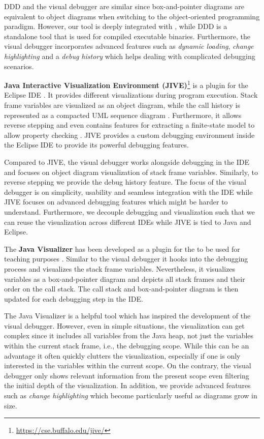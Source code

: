 \documentclass[sigconf]{acmart}
\begin{document}
DDD and the visual debugger are similar since box-and-pointer diagrams are equivalent to object diagrams when switching to the object-oriented programming paradigm.
However, our tool is deeply integrated with \intellij{}, while DDD is a standalone tool that is used for compiled executable binaries.
Furthermore, the visual debugger incorporates advanced features such as \textit{dynamic loading}, \textit{change highlighting} and a \textit{debug history} which helps dealing with complicated debugging scenarios.

\textbf{Java Interactive Visualization Environment (JIVE)}\footnote{\url{https://cse.buffalo.edu/jive/}} is a plugin for the Eclipse IDE \cite{gestwickiJIVEJavaInteractive2004}.
It provides different visualizations during program execution.
Stack frame variables are visualized as an object diagram, while the call history is represented as a compacted UML sequence diagram \cite{jayaramanCompactVisualizationJava2017}.
Furthermore, it allows reverse stepping and even contains features for extracting a finite-state model to allow property checking \cite{k.p.FiniteStateModel2021}.
JIVE provides a custom debugging environment inside the Eclipse IDE to provide its powerful debugging features.

Compared to JIVE, the visual debugger works alongside debugging in the IDE and focuses on object diagram visualization of stack frame variables.
Similarly, to reverse stepping we provide the debug history feature.
The focus of the visual debugger is on simplicity, usability and seamless integration with the IDE while JIVE focuses on advanced debugging features which might be harder to understand.
Furthermore, we decouple debugging and visualization such that we can reuse the visualization across different IDEs while JIVE is tied to Java and Eclipse.

The \textbf{Java Visualizer} has been developed as a plugin for the \intellij{} to be used for teaching purposes \cite{lipsitzJavaVisualizerIntelliJ2024}.
Similar to the visual debugger it hooks into the debugging process and visualizes the stack frame variables.
Nevertheless, it visualizes variables as a box-and-pointer diagram and depicts all stack frames and their order on the call stack.
The call stack and box-and-pointer diagram is then updated for each debugging step in the IDE.

The Java Visualizer is a helpful tool which has inspired the development of the visual debugger.
However, even in simple situations, the visualization can get complex since it includes all variables from the Java heap, not just the variables within the current stack frame, i.e., the debugging scope.
While this can be an advantage it often quickly clutters the visualization, especially if one is only interested in the variables within the current scope.
On the contrary, the visual debugger only shows relevant information from the present scope even filtering the initial depth of the visualization.
In addition, we provide advanced features such as \textit{change highlighting} which become particularly useful as diagrams grow in size.
\end{document}
